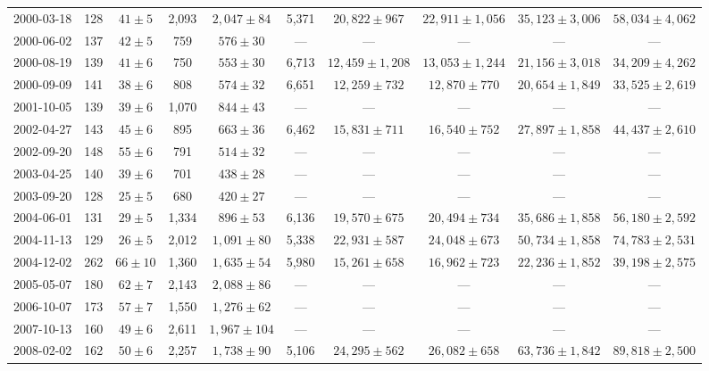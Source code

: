 \begin{landscape}
\begin{longtable}{cccccccccc}
{2000-03-18} & 128 & {$41  \pm  5$} & 2,093 & {$2,047 \pm 84$} & 5,371 & {$20,822 \pm 967$} & {$22,911 \pm 1,056$} & {$35,123 \pm 3,006$} & {$58,034 \pm 4,062$} \\
{2000-06-02} & 137 & {$42  \pm  5$} & 759 & {$576 \pm 30$} & --- & --- & --- & --- & --- \\
{2000-08-19} & 139 & {$41  \pm  6$} & 750 & {$553 \pm 30$} & 6,713 & {$12,459 \pm 1,208$} & {$13,053 \pm 1,244$} & {$21,156 \pm 3,018$} & {$34,209 \pm 4,262$} \\
{2000-09-09} & 141 & {$38  \pm  6$} & 808 & {$574 \pm 32$} & 6,651 & {$12,259 \pm 732$} & {$12,870 \pm 770$} & {$20,654 \pm 1,849$} & {$33,525 \pm 2,619$} \\
{2001-10-05} & 139 & {$39  \pm  6$} & 1,070 & {$844 \pm 43$} & --- & --- & --- & --- & --- \\
{2002-04-27} & 143 & {$45  \pm  6$} & 895 & {$663 \pm 36$} & 6,462 & {$15,831 \pm 711$} & {$16,540 \pm 752$} & {$27,897 \pm 1,858$} & {$44,437 \pm 2,610$} \\
{2002-09-20} & 148 & {$55  \pm  6$} & 791 & {$514 \pm 32$} & --- & --- & --- & --- & --- \\
{2003-04-25} & 140 & {$39  \pm  6$} & 701 & {$438 \pm 28$} & --- & --- & --- & --- & --- \\
{2003-09-20} & 128 & {$25  \pm  5$} & 680 & {$420 \pm 27$} & --- & --- & --- & --- & --- \\
{2004-06-01} & 131 & {$29  \pm  5$} & 1,334 & {$896 \pm 53$} & 6,136 & {$19,570 \pm 675$} & {$20,494 \pm 734$} & {$35,686 \pm 1,858$} & {$56,180 \pm 2,592$} \\
{2004-11-13} & 129 & {$26  \pm  5$} & 2,012 & {$1,091 \pm 80$} & 5,338 & {$22,931 \pm 587$} & {$24,048 \pm 673$} & {$50,734 \pm 1,858$} & {$74,783 \pm 2,531$} \\
{2004-12-02} & 262 & {$66  \pm  10$} & 1,360 & {$1,635 \pm 54$} & 5,980 & {$15,261 \pm 658$} & {$16,962 \pm 723$} & {$22,236 \pm 1,852$} & {$39,198 \pm 2,575$} \\
{2005-05-07} & 180 & {$62  \pm  7$} & 2,143 & {$2,088 \pm 86$} & --- & --- & --- & --- & --- \\
{2006-10-07} & 173 & {$57  \pm  7$} & 1,550 & {$1,276 \pm 62$} & --- & --- & --- & --- & --- \\
{2007-10-13} & 160 & {$49  \pm  6$} & 2,611 & {$1,967 \pm 104$} & --- & --- & --- & --- & --- \\
{2008-02-02} & 162 & {$50  \pm  6$} & 2,257 & {$1,738 \pm 90$} & 5,106 & {$24,295 \pm 562$} & {$26,082 \pm 658$} & {$63,736 \pm 1,842$} & {$89,818 \pm 2,500$} \\

\end{longtable}
\end{landscape}
